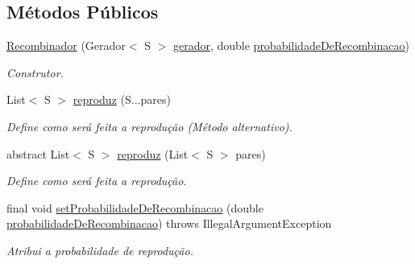 \subsection*{Métodos Públicos}
\begin{DoxyCompactItemize}
\item 
\hyperlink{classic_1_1populacional_1_1algoritmo_1_1operadores_1_1_recombinador_3_01_s_01extends_01_ser_01_4_ab45afc026c2af010a783404dc2df73c2}{Recombinador} (Gerador$<$ S $>$ \hyperlink{classic_1_1populacional_1_1algoritmo_1_1operadores_1_1_recombinador_3_01_s_01extends_01_ser_01_4_ab5240079f1ed131d203c9bba3c5fdddd}{gerador}, double \hyperlink{classic_1_1populacional_1_1algoritmo_1_1operadores_1_1_recombinador_3_01_s_01extends_01_ser_01_4_a2d53817f5d1454f1c428074bc6c82715}{probabilidade\-De\-Recombinacao})
\begin{DoxyCompactList}\small\item\em Construtor. \end{DoxyCompactList}\item 
List$<$ S $>$ \hyperlink{classic_1_1populacional_1_1algoritmo_1_1operadores_1_1_recombinador_3_01_s_01extends_01_ser_01_4_a6755dbbff58cfa791f0b267a43c97cf4}{reproduz} (S...\-pares)
\begin{DoxyCompactList}\small\item\em Define como será feita a reprodução (Método alternativo). \end{DoxyCompactList}\item 
abstract List$<$ S $>$ \hyperlink{classic_1_1populacional_1_1algoritmo_1_1operadores_1_1_recombinador_3_01_s_01extends_01_ser_01_4_a683ed63902d2eae7320da5c273035893}{reproduz} (List$<$ S $>$ pares)
\begin{DoxyCompactList}\small\item\em Define como será feita a reprodução. \end{DoxyCompactList}\item 
final void \hyperlink{classic_1_1populacional_1_1algoritmo_1_1operadores_1_1_recombinador_3_01_s_01extends_01_ser_01_4_ab74675adc30f50f94dcdeefcb7cc4a9c}{set\-Probabilidade\-De\-Recombinacao} (double \hyperlink{classic_1_1populacional_1_1algoritmo_1_1operadores_1_1_recombinador_3_01_s_01extends_01_ser_01_4_a2d53817f5d1454f1c428074bc6c82715}{probabilidade\-De\-Recombinacao})  throws Illegal\-Argument\-Exception 
\begin{DoxyCompactList}\small\item\em Atribui a probabilidade de reprodução. \end{DoxyCompactList}\item 

\end{DoxyCompactItemize}
